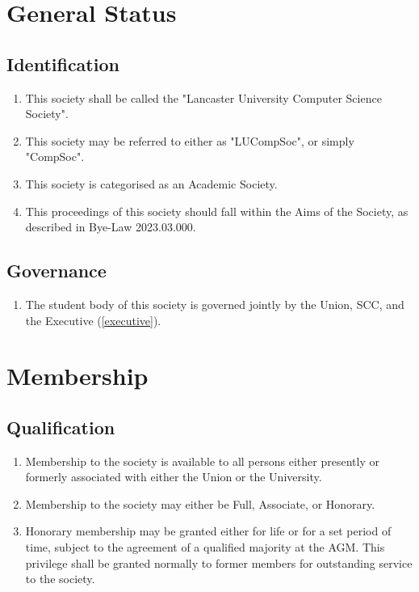 \documentclass{scrartcl}
\begin{document}
    \clearpage
    \section{General Status}
        \label{general}
        \subsection{Identification}
            \label{general--identification}
            \begin{enumerate}
                \item This society shall be called the "Lancaster University Computer Science Society".
                \item This society may be referred to either as "LUCompSoc", or simply "CompSoc".
                \item This society is categorised as an Academic Society.
                \item This proceedings of this society should fall within the Aims of the Society, as described in Bye-Law 2023.03.000.
            \end{enumerate}

        \subsection{Governance}
            \label{general--governance}
            \begin{enumerate}
                \item The student body of this society is governed jointly by the Union, SCC, and the Executive (\ref{executive}).
            \end{enumerate}

    \clearpage
    \section{Membership}
        \label{membership}
        \subsection{Qualification}
            \label{membership--qualification}
            \begin{enumerate}
                \item Membership to the society is available to all persons either presently or formerly associated with either the Union or the University.
                \item Membership to the society may either be Full, Associate, or Honorary.
                \item Honorary membership may be granted either for life or for a set period of time, subject to the agreement of a qualified majority at the AGM. This privilege shall be granted normally to former members for outstanding service to the society.
            \end{enumerate}
\end{document}
